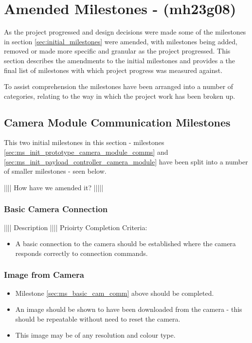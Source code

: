 
\section{Amended Milestones - (mh23g08)}
\label{sec:amended_milestones}
As the project progressed and design decisions were made some of the milestones in section
\ref{sec:initial_milestones} were amended, with milestones being added, removed or made more
specific and granular as the project progressed. This section describes the amendments to the
initial milestones and provides a the final list of milestones with which project progress was measured
against.

To assist comprehension the milestones have been arranged into a number of categories,
relating to the way in which the project work has been broken up. 

\subsection{Camera Module Communication Milestones}
This two initial milestones in this section - milestones \ref{sec:ms_init_prototype_camera_module_comms}
and \ref{sec:ms_init_payload_controller_camera_module}  have been split into a number of smaller
milestones - seen below.

|||| How have we amended it? |||||

	\subsubsection{Basic Camera Connection}
		|||| Description ||||
		Prioirty
		Completion Criteria:
		\label{sec:ms_basic_cam_comm}
		\begin{itemize}
			\item 	A basic connection to the camera should be established
				where the camera responds correctly to connection 
				commands.
		\end{itemize}

	\subsubsection{Image from Camera}
		\label{sec:ms_img_from_cam}
		\begin{itemize}
			\item 	Milestone \ref{sec:ms_basic_cam_comm} above should
				be completed.
			\item 	An image should be shown to have been downloaded 
				from the camera - this should be repeatable without
				need to reset the camera.
			\item 	This image may be of any resolution and colour type.
		\end{itemize} 

